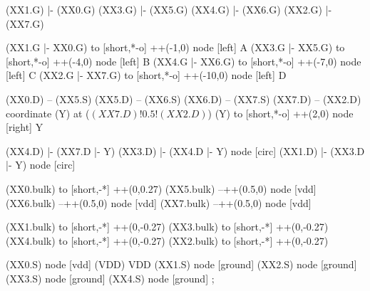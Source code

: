\begin{circuitikz}[american]
	(XX1.G) |- (XX0.G)
	(XX3.G) |- (XX5.G)
	(XX4.G) |- (XX6.G)
	(XX2.G) |- (XX7.G)
	
	(XX1.G |- XX0.G) to [short,*-o] ++(-1,0) node [left] {A}
	(XX3.G |- XX5.G) to [short,*-o] ++(-4,0) node [left] {B}
	(XX4.G |- XX6.G) to [short,*-o] ++(-7,0) node [left] {C}
	(XX2.G |- XX7.G) to [short,*-o] ++(-10,0) node [left] {D}
	
	(XX0.D) -- (XX5.S)
	(XX5.D) -- (XX6.S)
	(XX6.D) -- (XX7.S)
	(XX7.D) -- (XX2.D)
	coordinate (Y) at ($(XX7.D)!0.5!(XX2.D)$)
	(Y) to [short,*-o] ++(2,0) node [right] {Y}
	
	(XX4.D) |- (XX7.D |- Y)
	(XX3.D) |- (XX4.D |- Y) node [circ] {}
	(XX1.D) |- (XX3.D |- Y) node [circ] {}
	
	(XX0.bulk) to [short,-*] ++(0,0.27)
	(XX5.bulk) --++(0.5,0) node [vdd] {}
	(XX6.bulk) --++(0.5,0) node [vdd] {}
	(XX7.bulk) --++(0.5,0) node [vdd] {}
	
	(XX1.bulk) to [short,-*] ++(0,-0.27)
	(XX3.bulk) to [short,-*] ++(0,-0.27)
	(XX4.bulk) to [short,-*] ++(0,-0.27)
	(XX2.bulk) to [short,-*] ++(0,-0.27)


	(XX0.S) node [vdd] (VDD) {VDD}
	(XX1.S) node [ground] {}
	(XX2.S) node [ground] {}
	(XX3.S) node [ground] {}
	(XX4.S) node [ground] {}
;

\end{circuitikz}

